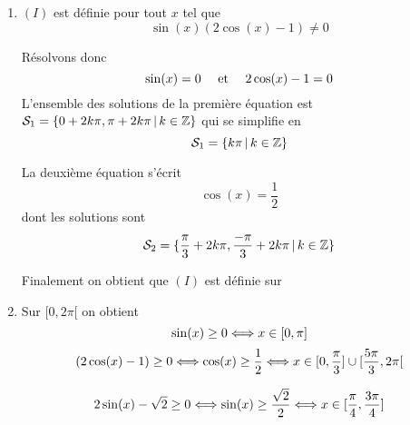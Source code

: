 \documentclass[a4paper, 11pt]{article}
\begin{document}
\begin{correction}
    \begin{enumerate}
        \item $(I)$ est définie pour tout $x$ tel que 
        $$\sin(x)(2\cos(x)-1) \neq 0$$

    Résolvons donc 
    $$\sin(x)=0 \quad \text{ et } \quad 2\cos(x)-1=0$$ 
L'ensemble des solutions de la première équation est 
$\mathcal{S}_1 = \{ 0+2k\pi, \pi +2k\pi\, |\, k\in \mathbb{Z}\}$
qui se simplifie en 
    $$\mathcal{S}_1 = \{ k\pi\, |\, k\in \mathbb{Z}\}$$

La deuxième équation s'écrit 
$$\cos(x) = \frac{1}{2}$$
dont les solutions sont 
$$\mathcal{S}_2 = \{ \frac{\pi}{3}+2k\pi,\frac{-\pi}{3} +2k\pi\, |\, k\in \mathbb{Z}\}$$

Finalement on obtient que $(I)$ est définie sur 


    \item Sur $[0,2\pi[$ on obtient 
    $$\sin(x)\geq0 \Longleftrightarrow x\in [0,\pi] $$
$$(2\cos(x)-1) \geq 0 \Longleftrightarrow \cos(x) \geq  \frac{1}{2}\Longleftrightarrow
x\in [0,\frac{\pi}{3}] \cup [\frac{5\pi}{3},2\pi[$$

$$2\sin(x) - \sqrt{2} \geq 0 \Longleftrightarrow \sin(x) \geq  \frac{\sqrt{2}}{2}\Longleftrightarrow
x\in [\frac{\pi}{4},\frac{3\pi}{4}] $$

 

    \conclusion{$\cS = ]\frac{\pi}{4}, \frac{\pi}{3} [ \cup ]\frac{3\pi}{4}, \pi [ \cup ]\frac{5\pi}{3}, 2\pi [ $}
    \end{enumerate}
\end{correction}
\end{document}
